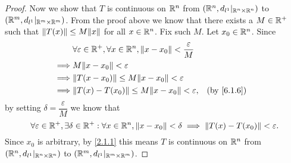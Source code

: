 \begin{proof}
  Now we show that \(T\) is continuous on \(\R^n\) from \((\R^n, d_{l^1}|_{\R^n \times \R^n})\) to \((\R^m, d_{l^1}|_{\R^m \times \R^m})\).
  From the proof above we know that there exists a \(M \in \R^+\) such that \(\norm*{T(x)} \leq M \norm*{x}\) for all \(x \in \R^n\).
  Fix such \(M\).
  Let \(x_0 \in \R^n\).
  Since
  \begin{align*}
             & \forall \varepsilon \in \R^+, \forall x \in \R^n, \norm*{x - x_0} < \dfrac{\varepsilon}{M}                 \\
    \implies & M \norm*{x - x_0} < \varepsilon                                                                            \\
    \implies & \norm*{T(x - x_0)} \leq M \norm*{x - x_0} < \varepsilon                                                    \\
    \implies & \norm*{T(x) - T(x_0)} \leq M \norm*{x - x_0} < \varepsilon,                                &  & \by{6.1.6}
  \end{align*}
  by setting \(\delta = \dfrac{\varepsilon}{M}\) we know that
  \[
    \forall \varepsilon \in \R^+, \exists \delta \in \R^+ : \forall x \in \R^n, \norm*{x - x_0} < \delta \implies \norm*{T(x) - T(x_0)} < \varepsilon.
  \]
  Since \(x_0\) is arbitrary, by \cref{2.1.1} this means \(T\) is continuous on \(\R^n\) from \((\R^n, d_{l^1}|_{\R^n \times \R^n})\) to \((\R^m, d_{l^1}|_{\R^m \times \R^m})\).
\end{proof}